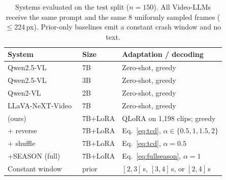 \begin{table}[!t]
\centering
\caption{Systems evaluated on the \dataset{} test split ($n{=}150$). All Video-LLMs receive the same prompt and the same 8 uniformly sampled frames ($\leq$224\,px). Prior-only baselines emit a constant crash window and no text.}
\label{tab:baselines}
\small
\begin{tabular}{@{}llp{3.1cm}@{}}
\toprule
\textbf{System} & \textbf{Size} & \textbf{Adaptation / decoding} \\
\midrule
Qwen2.5-VL~\cite{qwen25vl}          & 7B & Zero-shot, greedy \\
Qwen2.5-VL~\cite{qwen25vl}          & 3B & Zero-shot, greedy \\
Qwen2-VL~\cite{qwen2vl}             & 2B & Zero-shot, greedy \\
LLaVA-NeXT-Video~\cite{llavanextvideo} & 7B & Zero-shot, greedy \\
\midrule
\crashlogic{} (ours)                & 7B+LoRA & QLoRA on 1{,}198 \dataset{} clips; greedy \\
\quad +\tcd{} reverse               & 7B+LoRA & Eq.~\eqref{eq:tcd}, $\alpha\in\{0.5,1,1.5,2\}$ \\
\quad +\tcd{} shuffle               & 7B+LoRA & Eq.~\eqref{eq:tcd}, $\alpha{=}0.5$ \\
\quad +SEASON (full)                & 7B+LoRA & Eq.~\eqref{eq:fullseason}, $\alpha{=}1$ \\
\midrule
Constant window                     & prior   & $[2,3]$\,s, $[3,4]$\,s, or $[2,4]$\,s \\
\bottomrule
\end{tabular}
\end{table}
